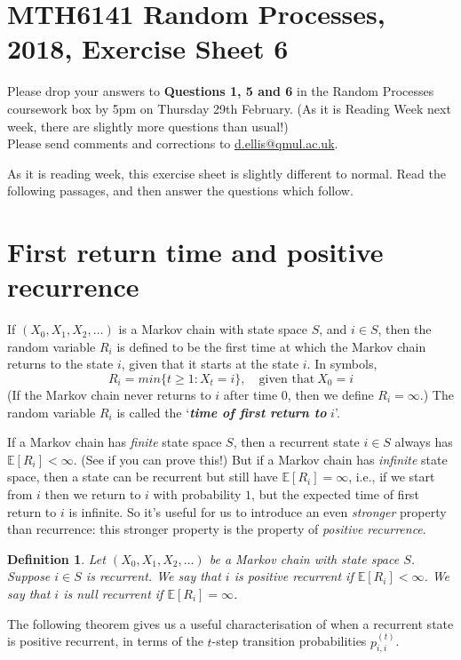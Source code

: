 \documentclass[11pt,a4paper]{article}
\newtheorem{definition}{Definition}
\begin{document}
    \section*{MTH6141 Random Processes, 2018, Exercise Sheet 6}
    Please drop your answers to \textbf{Questions 1, 5 and 6} in the Random Processes coursework box by 5pm on Thursday 29th February. (As it is Reading Week next week, there are slightly more questions than usual!)\\
    Please send comments and corrections to \href{d.ellis@qmul.ac.uk}{d.ellis@qmul.ac.uk}.\par
    As it is reading week, this exercise sheet is slightly different to normal. Read the following passages, and then answer the questions which follow.
    \section*{First return time and positive recurrence}
    If $(X_0, X_1, X_2,\ldots)$ is a Markov chain with state space $S$, and $i \in S$, then the random variable $R_i$ is defined to be the first time at which the Markov chain returns to the state $i$, given that it starts at the state $i$. In symbols,
    $$R_i = min\{t \geq 1: X_t = i\}, \quad \text{given that}\ X_0 = i$$
    (If the Markov chain never returns to $i$ after time $0$, then we define $ R_i = \infty $.) The random variable $R_i$ is called the ‘\textit{\textbf{time of first return to}} $i$’.\par
    If a Markov chain has \textit{finite} state space $S$, then a recurrent state $i \in S$ always has $\mathbb{E}[R_i] < \infty$. (See if you can prove this!) But if a Markov chain has \textit{infinite} state space, then a state can be recurrent but still have $\mathbb{E}[R_i] = \infty$, i.e., if we start from $i$ then we return to $i$ with probability $1$, but the expected time of first return to $i$ is infinite. So it’s useful for us to introduce an even \textit{stronger} property than recurrence: this stronger property is the property of \textit{positive recurrence}.
    \begin{definition}
      Let $(X_0, X_1, X_2,\ldots)$ be a Markov chain with state space $S$. Suppose $i \in S$ is recurrent. We say that $i$ is positive recurrent if $\mathbb{E}[R_i] < \infty $. We say that $i$ is null recurrent if $\mathbb{E}[R_i] = \infty $.
    \end{definition}
    The following theorem gives us a useful characterisation of when a recurrent state is positive recurrent, in terms of the $t$-step transition probabilities $p^{(t)}_{i,i}$.
\end{document}
